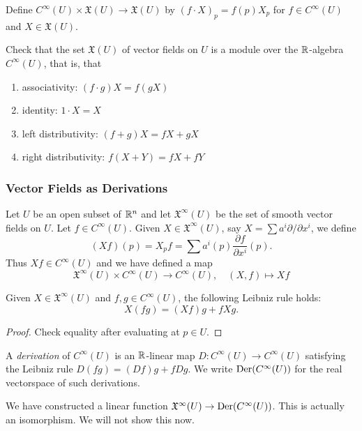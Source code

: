 \begin{frame}
  Define $C^{\infty}(U) \times \mathfrak{X}(U) \to \mathfrak{X}(U)$
  by $(f \cdot X)_p = f(p) X_p$ for $f \in C^{\infty}(U)$ and $X \in
  \mathfrak{X}(U)$.
  \begin{exercise}
    Check that the set $\mathfrak{X}(U)$ of vector fields on $U$ is
    a module over the $\mathbb R$-algebra $C^{\infty}(U)$, that is, that
    \begin{enumerate}
      \item associativity: $(f \cdot g) X = f(gX)$
      \item identity: $1 \cdot X = X$
      \item left distributivity: $(f + g) X = fX + gX$
      \item right distributivity: $f(X + Y) = fX + fY$
    \end{enumerate}
  \end{exercise}
\end{frame}
\begin{frame}
  \frametitle{Vector Fields as Derivations}
  Let $U$ be an open subset of $\mathbb R^n$ and
  let $\mathfrak{X}^{\infty}(U)$ be the set of smooth vector fields on $U$.
  Let $f \in C^{\infty}(U)$.
  Given $X \in \mathfrak{X}^{\infty}(U)$, say $X = \sum a^i \partial / \partial
  x^i$, we define
  \begin{displaymath}
    (Xf)(p) = X_p f = \sum a^i(p) \frac{\partial f}{\partial x^i}(p).
  \end{displaymath}
  Thus $Xf \in C^{\infty}(U)$
  and we have defined a map
  \begin{displaymath}
    \mathfrak{X}^{\infty}(U) \times C^{\infty}(U) \to C^{\infty}(U),
    \quad (X, f) \mapsto Xf
  \end{displaymath}
  \begin{prop}
    Given $X \in \mathfrak{X}^{\infty}(U)$ and $f, g \in C^{\infty}(U)$,
    the following Leibniz rule holds:
    \begin{displaymath}
      X(fg) = (Xf)g + fXg.
    \end{displaymath}
  \end{prop}
  \begin{proof}
    Check equality after evaluating at $p \in U$.
  \end{proof}
\end{frame}
\begin{frame}
  \begin{definition}
    A {\em derivation} of $C^{\infty}(U)$ is an $\mathbb R$-linear map
    $D \colon C^{\infty}(U) \to C^{\infty}(U)$
    satisfying the Leibniz rule $D(fg) = (Df)g + fDg$.
    We write $\operatorname{Der}(C^{\infty}(U))$ for the real vectorspace of 
    such derivations.
  \end{definition}
  We have constructed a linear function $\mathfrak{X}^{\infty}(U) \to
  \operatorname{Der}(C^{\infty}(U))$.
  This is actually an isomorphism. We will not show this now.
\end{frame}
